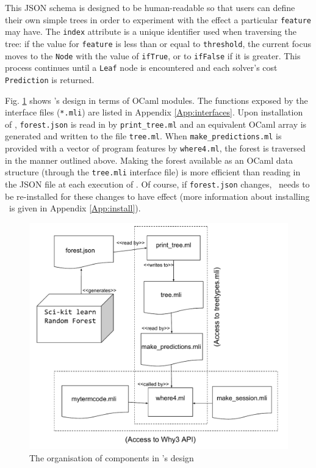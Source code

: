 This JSON schema is designed to be human-readable so that users can define their own simple trees in order to experiment with the effect a particular \texttt{feature} may have.
The \texttt{index} attribute is a unique identifier used when traversing the tree: if the value for \texttt{feature} is less than or equal to \texttt{threshold}, the current focus moves to the \texttt{Node} with the value of \texttt{ifTrue}, or to \texttt{ifFalse} if it is greater.
This process continues until a \texttt{Leaf} node is encountered and each solver's cost \texttt{Prediction} is returned.

\sloppypar
Fig. \ref{fig:Chapter5} shows \where's design in terms of OCaml modules.
The functions exposed by the interface files (\texttt{*.mli}) are listed in Appendix \ref{App:interfaces}. 
Upon installation of \where, \texttt{forest.json} is read in by \texttt{print\_tree.ml} and an equivalent OCaml array is generated and written to the file \texttt{tree.ml}.
When \texttt{make\_predictions.ml} is provided with a vector of program features by \texttt{where4.ml}, the forest is traversed  in the manner outlined above.
Making the forest available as an OCaml data structure (through the \texttt{tree.mli} interface file) is more efficient than reading in the JSON file at each execution of \where.
Of course, if \texttt{forest.json} changes, \where~needs to be re-installed for these changes to have effect (more information about installing \where~is given in Appendix \ref{App:install}).  


\begin{figure}
	\centering
	\includegraphics[width=1.0\linewidth]{Figures/Chapter5_stereo}
	\caption[\where~modules]{The organisation of components in \where's design}
	\label{fig:Chapter5}
\end{figure}

